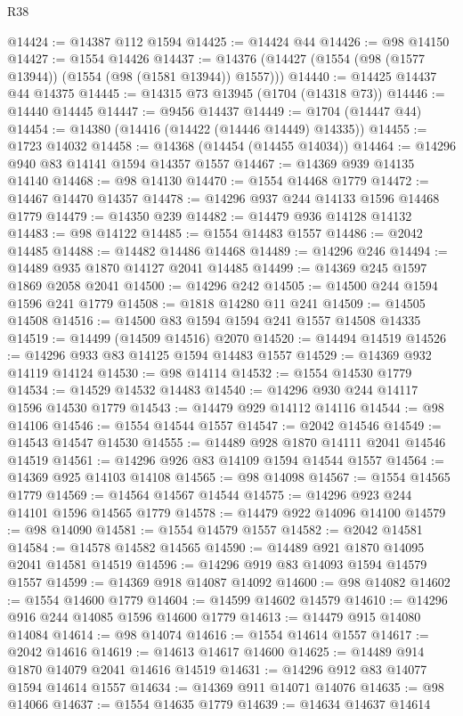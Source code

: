 \begin{lexlean}{R38}
\begin{coremodule}
@14424 := @14387 @112 @1594
@14425 := @14424 @44
@14426 := @98 @14150
@14427 := @1554 @14426
@14437 := @14376 (@14427 (@1554 (@98 (@1577 @13944)) (@1554 (@98 (@1581 @13944)) @1557)))
@14440 := @14425 @14437 @44 @14375
@14445 := @14315 @73 @13945 (@1704 (@14318 @73))
@14446 := @14440 @14445
@14447 := @9456 @14437
@14449 := @1704 (@14447 @44)
@14454 := @14380 (@14416 (@14422 (@14446 @14449) @14335))
@14455 := @1723 @14032
@14458 := @14368 (@14454 (@14455 @14034))
@14464 := @14296 @940 @83 @14141 @1594 @14357 @1557
@14467 := @14369 @939 @14135 @14140
@14468 := @98 @14130
@14470 := @1554 @14468 @1779
@14472 := @14467 @14470 @14357
@14478 := @14296 @937 @244 @14133 @1596 @14468 @1779
@14479 := @14350 @239
@14482 := @14479 @936 @14128 @14132
@14483 := @98 @14122
@14485 := @1554 @14483 @1557
@14486 := @2042 @14485
@14488 := @14482 @14486 @14468
@14489 := @14296 @246
@14494 := @14489 @935 @1870 @14127 @2041 @14485
@14499 := @14369 @245 @1597 @1869 @2058 @2041
@14500 := @14296 @242
@14505 := @14500 @244 @1594 @1596 @241 @1779
@14508 := @1818 @14280 @11 @241
@14509 := @14505 @14508
@14516 := @14500 @83 @1594 @1594 @241 @1557 @14508 @14335
@14519 := @14499 (@14509 @14516) @2070
@14520 := @14494 @14519
@14526 := @14296 @933 @83 @14125 @1594 @14483 @1557
@14529 := @14369 @932 @14119 @14124
@14530 := @98 @14114
@14532 := @1554 @14530 @1779
@14534 := @14529 @14532 @14483
@14540 := @14296 @930 @244 @14117 @1596 @14530 @1779
@14543 := @14479 @929 @14112 @14116
@14544 := @98 @14106
@14546 := @1554 @14544 @1557
@14547 := @2042 @14546
@14549 := @14543 @14547 @14530
@14555 := @14489 @928 @1870 @14111 @2041 @14546 @14519
@14561 := @14296 @926 @83 @14109 @1594 @14544 @1557
@14564 := @14369 @925 @14103 @14108
@14565 := @98 @14098
@14567 := @1554 @14565 @1779
@14569 := @14564 @14567 @14544
@14575 := @14296 @923 @244 @14101 @1596 @14565 @1779
@14578 := @14479 @922 @14096 @14100
@14579 := @98 @14090
@14581 := @1554 @14579 @1557
@14582 := @2042 @14581
@14584 := @14578 @14582 @14565
@14590 := @14489 @921 @1870 @14095 @2041 @14581 @14519
@14596 := @14296 @919 @83 @14093 @1594 @14579 @1557
@14599 := @14369 @918 @14087 @14092
@14600 := @98 @14082
@14602 := @1554 @14600 @1779
@14604 := @14599 @14602 @14579
@14610 := @14296 @916 @244 @14085 @1596 @14600 @1779
@14613 := @14479 @915 @14080 @14084
@14614 := @98 @14074
@14616 := @1554 @14614 @1557
@14617 := @2042 @14616
@14619 := @14613 @14617 @14600
@14625 := @14489 @914 @1870 @14079 @2041 @14616 @14519
@14631 := @14296 @912 @83 @14077 @1594 @14614 @1557
@14634 := @14369 @911 @14071 @14076
@14635 := @98 @14066
@14637 := @1554 @14635 @1779
@14639 := @14634 @14637 @14614

\end{coremodule}
\end{lexlean}
